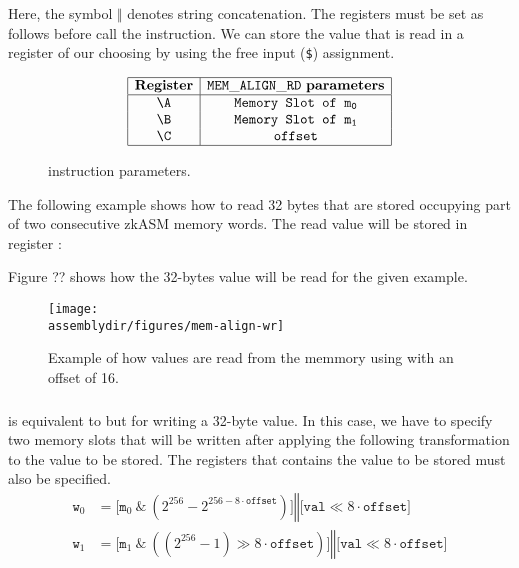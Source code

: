 Here, the symbol $\mathbin\Vert$ denotes string concatenation. The registers must be set as follows before call the \MEMALIGNRD instruction. We can store the value that is read in a register of our choosing by using the free input (\texttt{\$}) assignment.


\begin{figure}[h!]
    \renewcommand{\figurename}{Table}
    \[
    \begin{array}{|c|c|}
        \hline
        \mathbf{Register} &\mathtt{MEM\_ALIGN\_RD} \ \mathbf{parameters} \\ \hline
        \A & \texttt{Memory Slot of } \mathtt{m_0} \\
        \B & \texttt{Memory Slot of } \mathtt{m_1} \\
        \C & \texttt{offset} \\
        \hline
    \end{array}
    \]
    \caption{\MEMALIGNRD instruction parameters.}
    \label{tab:memory-first-example}
\end{figure}

The following example shows how to read 32 bytes that are stored occupying part of two consecutive zkASM memory words. The read value will be stored in register \A:


Figure ?? shows how the 32-bytes value will be read for the \MEMALIGNRD given example.

\begin{figure}[H]
    \centering
    \texttt{[image: \\assemblydir/figures/mem-align-wr]}
    \caption{Example of how values are read from the memmory using \MEMALIGNRD with an offset of 16.}
    \label{fig:memory-regions}
\end{figure}

\subsubsection{\MEMALIGNWR}
\MEMALIGNWR is equivalent to \MEMALIGNRD but for writing a 32-byte value. In this case, we have to specify two memory slots that will be written after applying the following transformation to the value to be stored. The registers that contains the value to be stored must also be specified.
\begin{align*}
    \texttt{w}_0 &= \Bigr[ \texttt{m}_0 \ \texttt{\&} \ \left(2^{256} - 2^{256-8 \cdot \texttt{offset}} \right) \Bigr] \mathbin\Vert \Bigr[  \texttt{val} \ll 8 \cdot \texttt{offset} \Bigr]  \\
    \texttt{w}_1 &= \Bigr[ \texttt{m}_1 \ \texttt{\&} \ \left( \left( 2^{256} - 1\right)  \gg 8 \cdot \texttt{offset}\right) \Bigr] \mathbin\Vert \Bigr[ \texttt{val} \ll 8 \cdot \texttt{offset} \Bigr] 
\end{align*}

